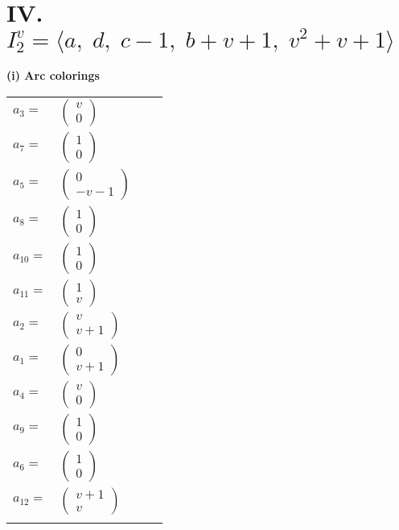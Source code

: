 \documentclass[1p]{elsarticle_modified}
\theoremstyle{definition}
\begin{document}
\centering \section*{IV. $I^v_{2}= \langle a,\;d,\;c-1,\;b+v+1,\;v^2+v+1 \rangle$}
\flushleft \textbf{(i) Arc colorings}\\
\begin{tabular}{m{7pt} m{180pt} m{7pt} m{180pt} }
\flushright $a_{3}=$&$\begin{pmatrix}v\\0\end{pmatrix}$ \\
\flushright $a_{7}=$&$\begin{pmatrix}1\\0\end{pmatrix}$ \\
\flushright $a_{5}=$&$\begin{pmatrix}0\\- v-1\end{pmatrix}$ \\
\flushright $a_{8}=$&$\begin{pmatrix}1\\0\end{pmatrix}$ \\
\flushright $a_{10}=$&$\begin{pmatrix}1\\0\end{pmatrix}$ \\
\flushright $a_{11}=$&$\begin{pmatrix}1\\v\end{pmatrix}$ \\
\flushright $a_{2}=$&$\begin{pmatrix}v\\v+1\end{pmatrix}$ \\
\flushright $a_{1}=$&$\begin{pmatrix}0\\v+1\end{pmatrix}$ \\
\flushright $a_{4}=$&$\begin{pmatrix}v\\0\end{pmatrix}$ \\
\flushright $a_{9}=$&$\begin{pmatrix}1\\0\end{pmatrix}$ \\
\flushright $a_{6}=$&$\begin{pmatrix}1\\0\end{pmatrix}$ \\
\flushright $a_{12}=$&$\begin{pmatrix}v+1\\v\end{pmatrix}$\\&\end{tabular}
\end{document}
